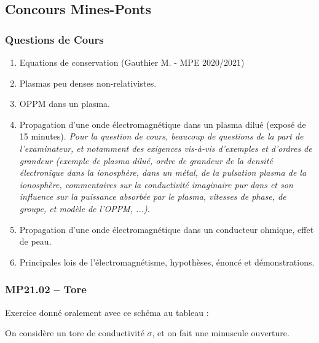 \newpage
\subsection*{Concours Mines-Ponts}
\subsubsection*{Questions de Cours}
\begin{enumerate}
    \item Equations de conservation (Gauthier M. - MPE 2020/2021)
    \item Plasmas peu denses non-relativistes.
    \item OPPM dans un plasma.
    \item Propagation d'une onde électromagnétique dans un plasma dilué (exposé de 15 minutes). \textit{\small{Pour la question de cours, beaucoup de questions de la part de l'examinateur, et notamment des exigences vis-à-vis d'exemples et d'ordres de grandeur (exemple de plasma dilué, ordre de grandeur de la densité électronique dans la ionosphère, dans un métal, de la pulsation plasma de la ionosphère, commentaires sur la conductivité imaginaire pur dans et son influence sur la puissance absorbée par le plasma, vitesses de phase, de groupe, et modèle de l'OPPM, ...).}}
    \item Propagation d'une onde électromagnétique dans un conducteur ohmique, effet de peau.
    \item Principales lois de l'électromagnétisme, hypothèses, énoncé et démonstrations.
\end{enumerate}

\subsubsection*{MP21.02 -- Tore  \lesdeux}

Exercice donné oralement avec ce schéma au tableau :

\begin{center}
\end{center}

On considère un tore de conductivité $\sigma$, et on fait une minuscule ouverture.

\begin{center}
\end{center}



